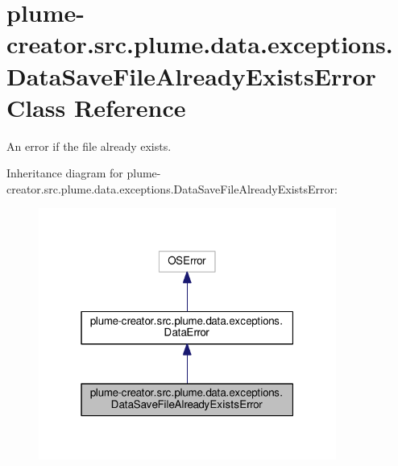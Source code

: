 \hypertarget{classplume-creator_1_1src_1_1plume_1_1data_1_1exceptions_1_1_data_save_file_already_exists_error}{}\section{plume-\/creator.src.\+plume.\+data.\+exceptions.\+Data\+Save\+File\+Already\+Exists\+Error Class Reference}
\label{classplume-creator_1_1src_1_1plume_1_1data_1_1exceptions_1_1_data_save_file_already_exists_error}


An error if the file already exists.  




Inheritance diagram for plume-\/creator.src.\+plume.\+data.\+exceptions.\+Data\+Save\+File\+Already\+Exists\+Error\+:
\nopagebreak
\begin{figure}[H]
\begin{center}
\leavevmode
\includegraphics[width=277pt]{classplume-creator_1_1src_1_1plume_1_1data_1_1exceptions_1_1_data_save_file_already_exists_error__inherit__graph}
\end{center}
\end{figure}


